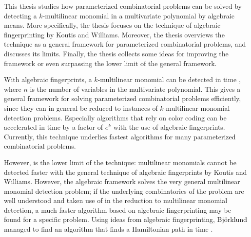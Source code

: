 %
%


\begin{enabstract}
  This thesis studies how parameterized combinatorial problems can be 
  solved by detecting a $k$-multilinear monomial in a multivariate polynomial 
  by algebraic means. More specifically, the thesis focuses on the technique 
  of algebraic fingerprinting by Koutis and Williams. Moreover, the thesis 
  overviews the technique as a general framework for parameterized combinatorial 
  problems, and discusses its limits. Finally, the thesis collects some ideas 
  for improving the framework or even surpassing the lower limit of the 
  general framework.

  With algebraic fingerprints, a $k$-multilinear monomial can be detected 
  in time , where $n$ is the number of variables in the 
  multivariate polynomial. This gives a general framework for solving parameterized 
  combinatorial problems efficiently, since they can in general be reduced to
  instances of $k$-multilinear 
  monomial detection problems. 
  Especially algorithms that rely on color coding can be accelerated in time 
  by a factor of $e^k$ with the use of algebraic fingerprints. Currently, 
  this technique underlies fastest algorithms 
  for many parameterized combinatorial problems. 

  However,  is the lower limit of the technique: 
  multilinear monomials cannot be detected faster 
  with the general technique of algebraic fingerprints by Koutis and Williams. 
  However, the algebraic framework solves the very general multilinear monomial 
  detection problem; if the underlying combinatorics of the problem are well understood 
  and taken use of in the reduction to multilinear monomial detection, 
  a much faster algorithm based on algebraic fingerprinting may be 
  found for a specific problem. Using ideas from algebraic fingerprinting, 
  Björklund managed to find an algorithm that 
  finds a Hamiltonian path in time .
%
\end{enabstract}
